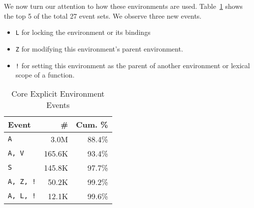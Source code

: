 \documentclass[10pt,review,sigplan,authorversion=true]{acmart}
\begin{document}
We now turn our attention to how these environments are used.
Table~\ref{table:core_explicit_env_seq} shows the top 5 of the total 27 event
sets. We observe three new events.
\begin{itemize}
\item \texttt{L} for locking the environment or its bindings
\item \texttt{Z} for modifying this environment's parent environment.
\item \texttt{!} for setting this environment as the parent of another
  environment or lexical scope of a function.
\end{itemize}

\begin{table}[!h]
  \small
  \caption{Core Explicit Environment Events} \label{table:core_explicit_env_seq}
  \centering
  \begin{tabular}{lrr}
    \toprule
    \textbf{Event}&\textbf{\#}&\textbf{Cum. \%}\\
    \midrule
    \texttt{A}&3.0M&88.4\%\\
    \texttt{A, V}&165.6K&93.4\%\\
    \texttt{S}&145.8K&97.7\%\\
    \texttt{A, Z, !}&50.2K&99.2\%\\
    \texttt{A, L, !}&12.1K&99.6\%\\
    \bottomrule
  \end{tabular}
\end{table}
\end{document}
